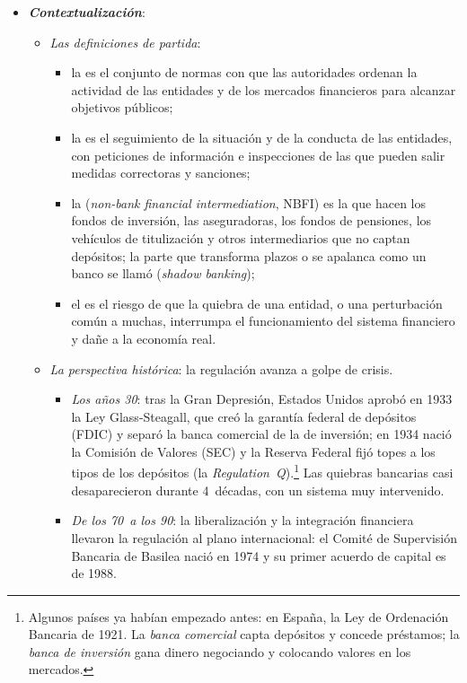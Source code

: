 \documentclass[11pt]{article}
\begin{document}
\begin{itemize}
\item \textbf{\emph{Contextualización}}:
  \begin{itemize}
  \item \emph{Las definiciones de partida}:
    \begin{itemize}
    \item la  es el conjunto de normas con que las autoridades ordenan la actividad de las entidades y de los mercados financieros para alcanzar objetivos públicos;
    \item la  es el seguimiento de la situación y de la conducta de las entidades, con peticiones de información e inspecciones de las que pueden salir medidas correctoras y sanciones;
    \item la  (\emph{non-bank financial intermediation}, NBFI) es la que hacen los fondos de inversión, las aseguradoras, los fondos de pensiones, los vehículos de titulización y otros intermediarios que no captan depósitos; la parte que transforma plazos o se apalanca como un banco se llamó  (\emph{shadow banking});
    \item el  es el riesgo de que la quiebra de una entidad, o una perturbación común a muchas, interrumpa el funcionamiento del sistema financiero y dañe a la economía real.
    \end{itemize}
  \item \emph{La perspectiva histórica}: la regulación avanza a golpe de crisis.
    \begin{itemize}
    \item \emph{Los años 30}: tras la Gran Depresión, Estados Unidos aprobó en 1933 la Ley Glass-Steagall, que creó la garantía federal de depósitos (FDIC) y separó la banca comercial de la de inversión; en 1934 nació la Comisión de Valores (SEC) y la Reserva Federal fijó topes a los tipos de los depósitos (la \emph{Regulation~Q})\nocite{FedHist2026GlassSteagall}.\footnote{Algunos países ya habían empezado antes: en España, la Ley de Ordenación Bancaria de 1921. La \emph{banca comercial} capta depósitos y concede préstamos; la \emph{banca de inversión} gana dinero negociando y colocando valores en los mercados.} Las quiebras bancarias casi desaparecieron durante 4~décadas, con un sistema muy intervenido.
    \item \emph{De los 70~a los 90}: la liberalización y la integración financiera llevaron la regulación al plano internacional: el Comité de Supervisión Bancaria de Basilea nació en 1974 y su primer acuerdo de capital es de 1988\nocite{BCBS2026Historia}.

\end{itemize}
\end{itemize}
\end{itemize}
\end{document}
